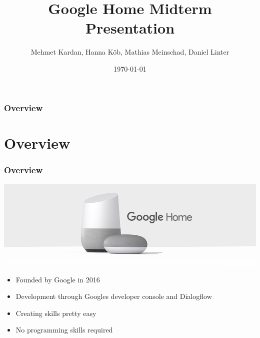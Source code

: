 \documentclass{beamer}
\title[Google Home]{Google Home Midterm Presentation} %
\author{Mehmet Kardan, Hanna Köb, Mathias Meinschad, Daniel Linter} %
\institute[UCLA] %
{
University of Innsbruck - SIT \\ %
}
\date{\today} %
\begin{document}
\begin{frame}
\titlepage %
\end{frame}

\begin{frame}
\frametitle{Overview} %
\tableofcontents %
\end{frame}


\section{Overview}

\begin{frame}
\frametitle{Overview}
\begin{center}
\includegraphics[scale=0.35]{pictures/google-home.png} 
\end{center}
\begin{itemize}
\item Founded by Google in 2016
\item Development through Googles developer console and Dialogflow
\item Creating skills pretty easy
\item No programming skills required
\end{itemize}
\end{frame}
\end{document}
